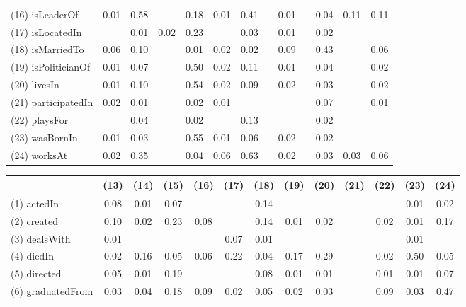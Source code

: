 \begin{table}[t]
\begin{center}
\begin{tabular}{l||*{12}{c}}
            (16) isLeaderOf  & 0.01  & 0.58  &    & 0.18  & 0.01  & 0.41  &    & 0.01  &    & 0.04  & 0.11  & 0.11 \\
            (17) isLocatedIn  &    & 0.01  & 0.02  & 0.23  &    & 0.03  &    & 0.01  &    & 0.02  &    &   \\
            (18) isMarriedTo  & 0.06  & 0.10  &    & 0.01  & 0.02  & 0.02  &    & 0.09  &    & 0.43  &    & 0.06 \\
            (19) isPoliticianOf  & 0.01  & 0.07  &    & 0.50  & 0.02  & 0.11  &    & 0.01  &    & 0.04  &    & 0.02 \\
            (20) livesIn  & 0.01  & 0.10  &    & 0.54  & 0.02  & 0.09  &    & 0.02  &    & 0.03  &    & 0.02 \\
            (21) participatedIn  & 0.02  & 0.01  &    & 0.02  & 0.01  &    &    &    &    & 0.07  &    & 0.01 \\
            (22) playsFor  &    & 0.04  &    & 0.02  &    & 0.13  &    &    &    & 0.02  &    &   \\
            (23) wasBornIn  & 0.01  & 0.03  &    & 0.55  & 0.01  & 0.06  &    & 0.02  &    & 0.02  &    &   \\
            (24) worksAt  & 0.02  & 0.35  &    & 0.04  & 0.06  & 0.63  &    & 0.02  &    & 0.03  & 0.03  & 0.06 \bigskip \\
        \end{tabular}
        \begin{tabular}{l||*{12}{c}}
                   & (13) & (14) & (15) & (16) & (17) & (18) & (19) & (20) & (21) & (22) & (23) & (24) \\
            \hline
            (1) actedIn  & 0.08  & 0.01  & 0.07  &    &    & 0.14  &    &    &    &    & 0.01  & 0.02 \\
            (2) created  & 0.10  & 0.02  & 0.23  & 0.08  &    & 0.14  & 0.01  & 0.02  &    & 0.02  & 0.01  & 0.17 \\
            (3) dealsWith  & 0.01  &    &    &    & 0.07  & 0.01  &    &    &    &    & 0.01  &   \\
            (4) diedIn  & 0.02  & 0.16  & 0.05  & 0.06  & 0.22  & 0.04  & 0.17  & 0.29  &    & 0.02  & 0.50  & 0.05 \\
            (5) directed  & 0.05  & 0.01  & 0.19  &    &    & 0.08  & 0.01  & 0.01  &    & 0.01  & 0.01  & 0.07 \\
            (6) graduatedFrom  & 0.03  & 0.04  & 0.18  & 0.09  & 0.02  & 0.05  & 0.02  & 0.03  &    & 0.09  & 0.03  & 0.47 \\

\end{tabular}
\end{center}
\end{table}
